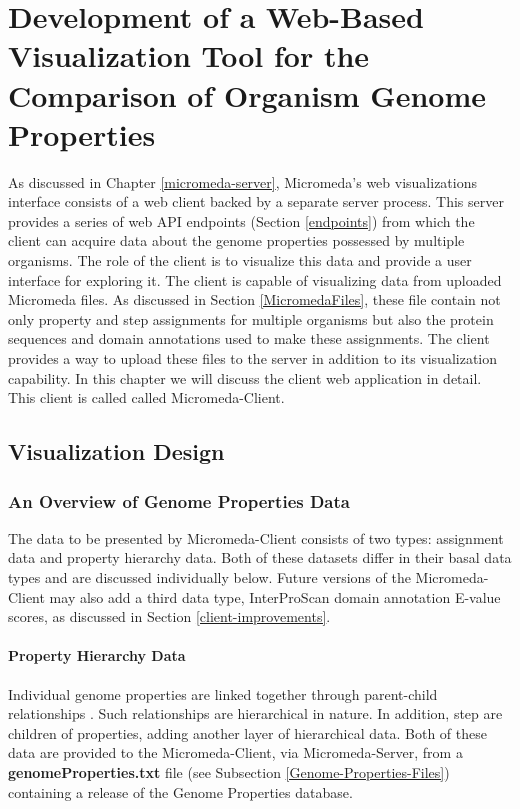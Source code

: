 \chapter{Development of a Web-Based Visualization Tool for the Comparison of Organism Genome Properties} \label{micromeda-client}

As discussed in Chapter \ref{micromeda-server}, Micromeda's web visualizations interface consists of a web client backed by a separate server process. This server provides a series of web API endpoints (Section \ref{endpoints}) from which the client can acquire data about the genome properties possessed by multiple organisms. The role of the client is to visualize this data and provide a user interface for exploring it. The client is capable of visualizing data from uploaded Micromeda files. As discussed in Section \ref{MicromedaFiles}, these file contain not only property and step assignments for multiple organisms but also the protein sequences and domain annotations used to make these assignments. The client provides a way to upload these files to the server in addition to its visualization capability. In this chapter we will discuss the client web application in detail. This client is called called Micromeda-Client.

\section{Visualization Design}

\subsection{An Overview of Genome Properties Data}

The data to be presented by Micromeda-Client consists of two types: assignment data and property hierarchy data. Both of these datasets differ in their basal data types and are discussed individually below. Future versions of the Micromeda-Client may also add a third data type, InterProScan domain annotation E-value scores, as discussed in Section \ref{client-improvements}.

\subsubsection{Property Hierarchy Data}

Individual genome properties are linked together through parent-child relationships \cite{richardson2018genome}. Such relationships are hierarchical in nature. In addition, step are children of properties, adding another layer of hierarchical data. Both of these data are provided to the Micromeda-Client, via Micromeda-Server, from a \textbf{genomeProperties.txt} file (see Subsection \ref{Genome-Properties-Files}) containing a release of the Genome Properties database.

